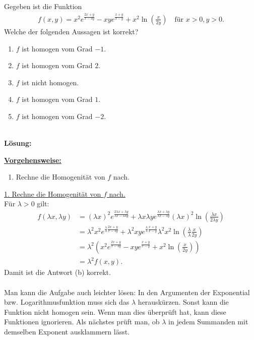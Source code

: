 \newpage

\subsection*{}
Gegeben ist die Funktion
\begin{align*}
	f(x,y) 
	=
	x^2 e^{\frac{ 2x+y}{x - 3y }}
	-
	xy e^{\frac{x+y}{x-y}}
	+
	x^2 \ln \left( \frac{x }{2y} \right)
	\quad \textrm{für } x>0,y>0.
\end{align*}
Welche der folgenden Aussagen ist korrekt?
\renewcommand{\labelenumi}{(\alph{enumi})}
\begin{enumerate}
	\item
	$ f  $ ist homogen vom Grad $ -1 $.
	\item
	$ f  $ ist homogen vom Grad $ 2 $.
	\item
	$f $ ist nicht homogen.
	\item 
	$ f  $ ist homogen vom Grad $ 1$.
	\item
	$ f  $ ist homogen vom Grad $ -2 $.
\end{enumerate}\ \\
\textbf{Lösung:}
\begin{mdframed}
\underline{\textbf{Vorgehensweise:}}
\renewcommand{\labelenumi}{\theenumi.}
\begin{enumerate}
\item Rechne die Homogenität von $f$ nach.
\end{enumerate}
\end{mdframed}

\underline{1. Rechne die Homogenität von $f$ nach.}\\
Für $\lambda > 0$ gilt:
\begin{align*}
	f(\lambda x , \lambda y)
	&=
	(\lambda x)^2
	e^{
	\frac{2 \lambda x+ \lambda y}{\lambda x -3 \lambda y}
	}
	+ \lambda x \lambda y 
	e^{
	\frac{\lambda x + \lambda y}{\lambda x - \lambda y}
	}
	( \lambda x)^2
	\ln \left(
	\frac{ \lambda x}{2 \lambda y}
	\right)\\
	&=
	\lambda^2 x^2
	e^{
		\frac{\lambda}{\lambda}\frac{2  x+  y}{ x -3 y}
	}
	+ \lambda^2 x  y 
	e^{
		\frac{\lambda}{\lambda}	\frac{ x +  y}{ x -  y}
	}
	\lambda^2 x^2
	\ln \left(
	\frac{\lambda}{\lambda}
	\frac{  x}{2  y}
	\right)\\
	&=
	\lambda^2
	\left(
	x^2 e^{\frac{ 2x+y}{x - 3y }}
	-
	xy e^{\frac{x+y}{x-y}}
	+
	x^2 \ln \left( \frac{x }{2y} \right)
	\right)\\
	&=
	\lambda^2 
	f(x,y).
\end{align*}
Damit ist die Antwort (b) korrekt.\\
\\
Man kann die Aufgabe auch leichter lösen:
In den Argumenten der Exponential bzw. Logarithmusfunktion muss sich das $\lambda$ herauskürzen. Sonst kann die Funktion nicht homogen sein. Wenn man dies überprüft hat, kann diese Funktionen ignorieren.
Als nächstes prüft man, ob $\lambda $ in jedem Summanden mit demselben Exponent ausklammern lässt.



